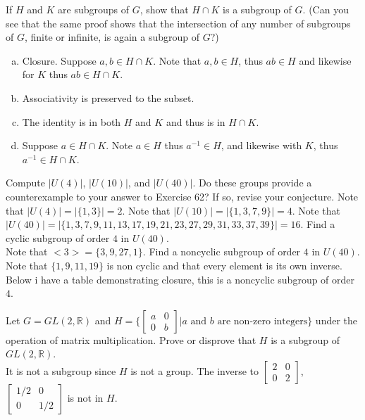 \documentclass[12pt]{article}
\makeatletter
\theoremstyle{homework}
\newenvironment{exercise}[1]
{\def\@currentlabel{#1}\exercisecore}
{\endexercisecore}
\makeatother
\begin{document}
\begin{exercise}
{3.32}
If $H$ and $K$ are subgroups of $G$, show that $H \cap K$ is a subgroup of $G$. (Can you see that the same proof shows that the intersection of  any number of subgroups of $G$, finite or infinite, is again a subgroup of $G$?)
\begin{enumerate}[(a)]
\item
Closure.  Suppose $a,b\in H \cap K$.  Note that $a,b\in H$, thus $ab\in H$ and likewise for $K$ thus $ab\in H \cap K$.
\item
Associativity is preserved to the subset.
\item
The identity is in both $H$ and $K$ and thus is in $H \cap K$.
\item
Suppose $a\in H \cap K$.  Note $a\in H$ thus $a^{-1}\in H$, and likewise with $K$, thus $a^{-1}\in H \cap K$.

\end{enumerate}
\end{exercise}
\begin{exercise}
{3.64}
Compute $|U(4)|$, $|U(10)|$, and $|U(40)|$. Do these groups provide a counterexample to your answer to Exercise 62? If so, revise your conjecture.
Note that $|U(4)|=|\{1,3\}|=2$.  
Note that $|U(10)|=|\{1,3,7,9\}|=4$.  
Note that $|U(40)|=|\{1,3,7,9,11,13,17,19,21,23,27,29,31,33,37,39\}|=16$.
\end{exercise}
\begin{exercise}
{3.65}
Find a cyclic subgroup of order $4$ in $U(40)$.\\
Note that $<3>=\{3,    9,   27,    1\}$.
\end{exercise}
\begin{exercise}
{3.66}
Find a noncyclic subgroup of order $4$ in $U(40)$.\\
Note that $\{1,9,11,19\}$ is non cyclic and that every element is its own inverse.  Below i have a table demonstrating closure, this is a noncyclic subgroup of order $4$.

\end{exercise}
\begin{exercise}
{3.71}
Let $G = GL(2,\mathbb{R})$ and $H =\biggr\{\begin{bmatrix}
a&0\\0&b
\end{bmatrix}\biggr | a \text{ and } b \text{ are non-zero integers}\biggr\}$ under the operation of matrix multiplication. Prove or disprove that $H$ is a subgroup of $GL(2,\mathbb{R})$.\\
It is not a subgroup since $H$ is not a group.  The inverse to $\begin{bmatrix} 2&0\\0&2 \end{bmatrix}$, $\begin{bmatrix} 1/2&0\\0&1/2 \end{bmatrix}$ is not in $H$.
\end{exercise}
\end{document}
